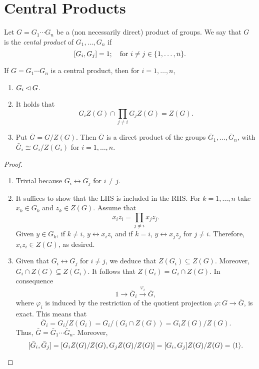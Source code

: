 \section{Central Products}

\begin{defn}
    Let\/ $G=G_1\cdots G_n$ be a (non necessarily direct) product of groups. We say that\/ $G$ is the \textsl{cental product} of\/ $G_1,\dots,G_n$ if
    $$
        [G_i,G_j]=1;\quad\text{\rm for } i\ne j\in\{1,\dots, n\}.
    $$
\end{defn}

\begin{thm}
    If\/ $G=G_1\cdots G_n$ is a central product, then for\/ $i=1,\dots,n$,
    \begin{enumerate}[\rm a)]
    \item $G_i\lhd G$.
    \item It holds that
    $$
        G_iZ(G)\cap\prod_{j\ne i} G_jZ(G) = Z(G).
    $$
    \item Put\/ $\bar G = G/Z(G)$. Then\/ $\bar G$ is a direct product of the groups\/ $\bar G_1, \dots,\bar G_n$, with\/ $\bar G_i\cong G_i/Z(G_i)$ for\/ $i= 1,\dots,n$.
    \end{enumerate}
\end{thm}

\begin{proof}${}$

\begin{enumerate}[\rm a)]
    \item Trivial because $G_i\leftrightarrow G_j$ for $i\ne j$.

    \item It suffices to show that the LHS is included in the RHS. For $k=1,\dots,n$ take $x_k\in G_k$ and $z_k\in Z(G)$. Assume that
    $$
        x_iz_i=\prod_{j\ne i}x_jz_j.
    $$
    Given $y\in G_k$, if $k\ne i$, $y\leftrightarrow x_iz_i$ and if $k=i$, $y\leftrightarrow x_jz_j$ for $j\ne i$. Therefore, $x_iz_i\in Z(G)$, as desired.
    
    \item Given that $G_i\leftrightarrow G_j$ for $i\ne j$, we deduce that $Z(G_i)\subseteq Z(G)$. Moreover, $G_i\cap Z(G)\subseteq Z(G_i)$. It follows that $Z(G_i)=G_i\cap Z(G)$. In consequence
    $$
        1\to \bar G_i\stackrel{\varphi_i}\to \bar G,
    $$
    where $\varphi_i$ is induced by the restriction of the quotient projection $\varphi\colon G\to\bar G$, is exact. This means that
    $$
        \bar G_i = G_i/Z(G_i) = G_i/(G_i\cap Z(G)) = G_iZ(G)/Z(G).
    $$
    Thus, $\bar G=\bar G_1\cdots\bar G_n$. Moreover,
    $$
        [\bar G_i,\bar G_j] = [G_iZ(G)/Z(G),G_jZ(G)/Z(G)]
            = [G_i,G_j]Z(G)/Z(G) = \langle1\rangle.
    $$
\end{enumerate}
\end{proof}


